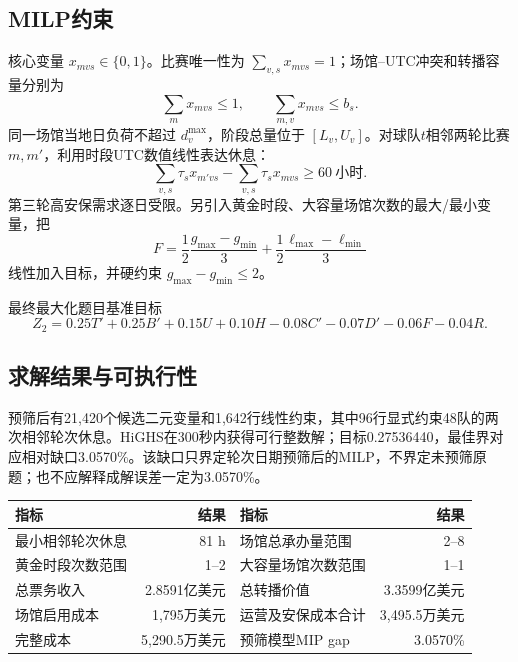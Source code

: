 \documentclass[UTF8,11pt,a4paper]{ctexart}
\begin{document}
\subsection{MILP约束}
核心变量 $x_{mvs}\in\{0,1\}$。比赛唯一性为 $\sum_{v,s}x_{mvs}=1$；场馆--UTC冲突和转播容量分别为
\begin{equation}
\sum_mx_{mvs}\le1,\qquad \sum_{m,v}x_{mvs}\le b_s.
\end{equation}
同一场馆当地日负荷不超过 $d_v^{\max}$，阶段总量位于 $[L_v,U_v]$。对球队$t$相邻两轮比赛$m,m'$，利用时段UTC数值线性表达休息：
\begin{equation}
\sum_{v,s}\tau_s x_{m'vs}-\sum_{v,s}\tau_sx_{mvs}\ge60\ \text{小时}.
\end{equation}
第三轮高安保需求逐日受限。另引入黄金时段、大容量场馆次数的最大/最小变量，把
\begin{equation}
F=\frac12\frac{g_{\max}-g_{\min}}3+\frac12\frac{\ell_{\max}-\ell_{\min}}3
\end{equation}
线性加入目标，并硬约束 $g_{\max}-g_{\min}\le2$。

最终最大化题目基准目标
\begin{equation}
Z_2=0.25T'+0.25B'+0.15U+0.10H-0.08C'-0.07D'-0.06F-0.04R.
\end{equation}

\subsection{求解结果与可执行性}
预筛后有21,420个候选二元变量和1,642行线性约束，其中96行显式约束48队的两次相邻轮次休息。HiGHS\cite{highs}在300秒内获得可行整数解；目标0.27536440，最佳界对应相对缺口3.0570\%。该缺口只界定轮次日期预筛后的MILP，不界定未预筛原题；也不应解释成解误差一定为3.0570\%。

\begin{table}[H]\centering\small
\begin{tabular}{lrlr}
\toprule 指标 & 结果 & 指标 & 结果\\\midrule
最小相邻轮次休息 & 81 h & 场馆总承办量范围 & 2--8\\
黄金时段次数范围 & 1--2 & 大容量场馆次数范围 & 1--1\\
总票务收入 & 2.8591亿美元 & 总转播价值 & 3.3599亿美元\\
场馆启用成本 & 1,795万美元 & 运营及安保成本合计 & 3,495.5万美元\\
完整成本 & 5,290.5万美元 & 预筛模型MIP gap & 3.0570\%\\
\bottomrule
\end{tabular}
\end{table}
\end{document}
